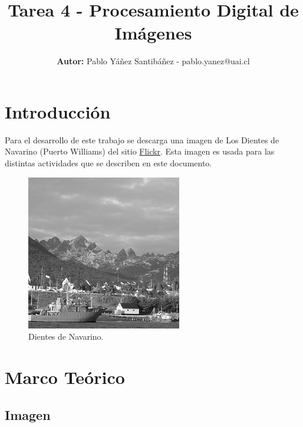 \documentclass[
  letterpaper,
  twocolumn,
  9pt,
  journal,
  final]{IEEEtran}
\title{Tarea 4 - Procesamiento Digital de Imágenes}
\author{\textbf{Autor:} Pablo Yáñez Santibáñez - pablo.yanez@uai.cl}
\begin{document}
\maketitle


\tableofcontents




\section{Introducción}

Para el desarrollo de este trabajo se descarga una imagen de Los Dientes de Navarino (Puerto Williams) del sitio \href{https://www.flickr.com/photos/whitewizard/7062826349/in/album-72157629780861323/}{Flickr}. Esta imagen es usada para las distintas actividades que se describen en este documento.

\begin{figure}[h!]
	\centering
	\includegraphics[width=0.4\linewidth, trim={0cm 0cm 0cm 0cm}, clip]{outs/gaussiano/img.jpg}
	\caption{Dientes de Navarino.}
	\label{dientes}
\end{figure}

\section{Marco Teórico} \label{teo}

\subsection{Imagen}
\end{document}
